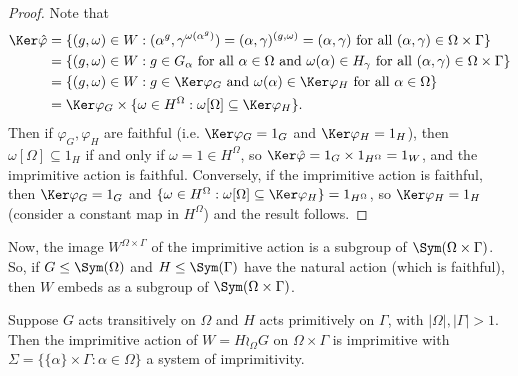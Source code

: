 \begin{proof}
    Note that
    \begin{align*}
        \Ker\hat\varphi & = \{(g,\omega) \in W : (\alpha^g,\gamma^{\omega(\alpha^g)}) = (\alpha,\gamma)^{(g,\omega)} = (\alpha,\gamma)\ \text{for all}\ (\alpha,\gamma) \in \Omega \times \Gamma\}      \\
                        & = \{(g,\omega) \in W : g \in G_\alpha\ \text{for all}\ \alpha \in \Omega\ \text{and}\ \omega(\alpha) \in H_\gamma\ \text{for all}\ (\alpha,\gamma) \in \Omega \times \Gamma\} \\
                        & = \{(g,\omega) \in W : g \in \Ker\varphi_G\ \text{and}\ \omega(\alpha) \in \Ker\varphi_H\ \text{for all}\ \alpha \in \Omega\}                                                 \\
                        & = \Ker\varphi_G \times \{\omega \in H^\Omega : \omega[\Omega] \subseteq \Ker\varphi_H\}.
    \end{align*}
    Then if $\varphi_G,\varphi_H$ are faithful (i.e. $\Ker\varphi_G = 1_G$ and $\Ker\varphi_H = 1_H$), then $\omega[\Omega] \subseteq 1_H$ if and only if $\omega = 1 \in H^\Omega$, so $\Ker\hat\varphi = 1_G \times 1_{H^\Omega} = 1_W$, and the imprimitive action is faithful. Conversely, if the imprimitive action is faithful, then $\Ker\varphi_G = 1_G$ and $\{\omega \in H^\Omega : \omega[\Omega] \subseteq \Ker\varphi_H\} = 1_{H^\Omega}$, so $\Ker\varphi_H = 1_H$ (consider a constant map in $H^\Omega$) and the result follows.
\end{proof}

Now, the image $W^{\Omega \times \Gamma}$ of the imprimitive action is a subgroup of $\Sym(\Omega \times \Gamma)$. So, if $G \leq \Sym(\Omega)$ and $H \leq \Sym(\Gamma)$ have the natural action (which is faithful), then $W$ embeds as a subgroup of $\Sym(\Omega \times \Gamma)$.

\begin{lemma}\label{lem:imprimitive_action_is_imprimitive}
    Suppose $G$ acts transitively on $\Omega$ and $H$ acts primitively on $\Gamma$, with $|\Omega|,|\Gamma| > 1$. Then the imprimitive action of $W = H \wr_\Omega G$ on $\Omega \times \Gamma$ is imprimitive with $\Sigma = \{\{\alpha\} \times \Gamma : \alpha \in \Omega\}$ a system of imprimitivity.
\end{lemma}

